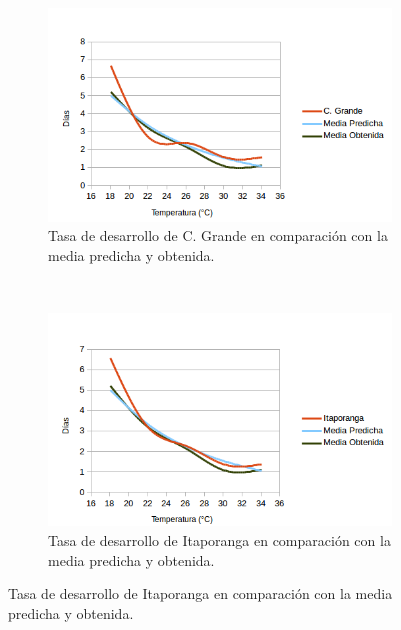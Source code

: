 \begin{figure}[!htbp]
\begin{subfigure}[b]{0.45\textwidth}
    \end{subfigure}
    \begin{subfigure}[b]{0.45\textwidth}
            \includegraphics[width=\textwidth]{capitulo-6/graphics/desarrollo-pupa-3.png}
            \caption{Tasa de desarrollo de C. Grande en comparación con la media predicha y obtenida.}
    \end{subfigure}
    ~~~~
    \begin{subfigure}[b]{0.45\textwidth}
            \includegraphics[width=\textwidth]{capitulo-6/graphics/desarrollo-pupa-4.png}
            \caption{Tasa de desarrollo de Itaporanga en comparación con la media predicha y obtenida.}


\end{subfigure}
\end{figure}
